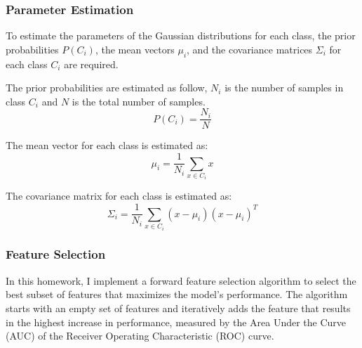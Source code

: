 \documentclass[12pt,a4paper]{article}
\begin{document}
\subsubsection{Parameter Estimation}
To estimate the parameters of the Gaussian distributions for each class, the prior probabilities $P(C_i)$, the mean vectors $\mu_i$, and the covariance matrices $\Sigma_i$ for each class $C_i$ are required.

The prior probabilities are estimated as follow, $N_i$ is the number of samples in class $C_i$ and $N$ is the total number of samples.
$$
P(C_i) = \frac{N_i}{N}
$$

The mean vector for each class is estimated as:
$$
\mu_i = \frac{1}{N_i} \sum_{x \in C_i} x
$$

The covariance matrix for each class is estimated as:
$$
\Sigma_i = \frac{1}{N_i} \sum_{x \in C_i} (x - \mu_i)(x - \mu_i)^T
$$

\subsubsection{Feature Selection}
In this homework, I implement a forward feature selection algorithm to select the best subset of features that maximizes the model's performance. The algorithm starts with an empty set of features and iteratively adds the feature that results in the highest increase in performance, measured by the Area Under the Curve (AUC) of the Receiver Operating Characteristic (ROC) curve.
\end{document}
